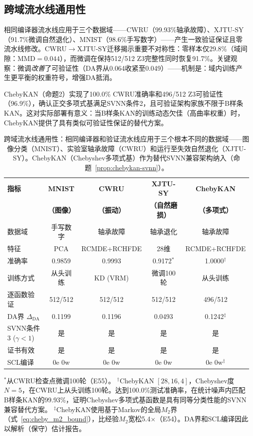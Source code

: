 \documentclass[journal,onecolumn]{IEEEtran}
\theoremstyle{definition}
\theoremstyle{plain}
\theoremstyle{remark}
\begin{document}
\subsection{跨域流水线通用性}
\label{sec:cross_domain}

相同编译器流水线应用于三个数据域——CWRU（99.93\%轴承故障）、XJTU-SY（91.7\%微调自然退化）、MNIST（98.6\%手写数字）——产生一致验证保证且零流水线修改。CWRU$\to$XJTU-SY迁移揭示重要不对称性：零样本仅29.8\%（域间隙：MMD$=0.044$），而微调在保持512/512 Z3完整性同时恢复91.7\%。关键观察：微调\textit{改善}了可验证性（DA界从0.064收紧至0.049）——机制是：域内训练产生更平衡的权重符号，增强DA抵消。

ChebyKAN（命题2）实现了100.0\% CWRU准确率和496/512 Z3可验证性（96.9\%），确认正交多项式基满足SVNN条件2，且可验证架构家族不限于B样条KAN。这对实际部署有意义：当B样条KAN的训练动态欠佳（高曲率权重）时，ChebyKAN提供了具有类似可验证性保证的替代方案。

\begin{table}[tb]
\centering
\caption{跨域流水线通用性：相同编译器和验证流水线应用于三个根本不同的数据域——图像分类（MNIST）、实验室轴承故障（CWRU）和运行至失效自然退化（XJTU-SY）。ChebyKAN（Chebyshev多项式基）作为替代SVNN兼容架构纳入（命题~\ref{prop:chebykan-svnn}）。}
\label{tab:cross_domain}
\footnotesize
\begin{tabular}{@{}lcccc@{}}
\toprule
\textbf{指标} & \textbf{MNIST} & \textbf{CWRU} & \textbf{XJTU-SY} & \textbf{ChebyKAN} \\
 & \textbf{（图像）} & \textbf{（振动）} & \textbf{（自然磨损）} & \textbf{（多项式）} \\
\midrule
  数据域 & 手写数字 & 轴承故障 & 轴承退化 & 轴承故障 \\
  特征 & PCA & RCMDE+RCHFDE & 28维 & RCMDE+RCHFDE \\
  准确率 & 0.9859 & 0.9993 & 0.9172$^{*}$ & 1.0000$^{\dag}$ \\
  训练方式 & 从头训练 & KD (VRM) & 微调100轮 & 从头训练 \\
\midrule
  逐函数验证 & 512/512 & 512/512 & 512/512 & 496/512 \\
  DA界 $\Delta_{\text{DA}}$ & 0.1199 & 0.1196 & 0.0493 & 0.1242$^{\ddag}$ \\
  SVNN条件3 ($\gamma<1$) & 是 & 是 & 是 & 是 \\
  证书有效 & 是 & 是 & 是 & 是 \\
  SCL编译 & 0e 0w & 0e 0w & 0e 0w & 0e 0w$^{\ddag}$ \\
\bottomrule
\end{tabular}
\vspace{2pt}
{\scriptsize
$^{*}$从CWRU检查点微调100轮（E55）。
$^{\dag}$ChebyKAN $[28,16,4]$，Chebyshev度$N{=}5$，在CWRU上从头训练100轮。达到100.0\%测试准确率，在统计噪声内匹配B样条KAN的99.93\%，证明Chebyshev多项式基函数是具有同等分类性能的SVNN兼容替代方案。
$^{\ddag}$ChebyKAN使用基于Markov的全局$M_2$界（式~\ref{eq:cheby_m2_bound}），比经验$M_2$宽松5.4$\times$（E54）。DA界和SCL编译因此以解析（保守）估计报告。}
\end{table}
\end{document}
